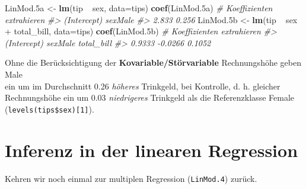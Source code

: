 \documentclass[12pt,ngerman,]{book}
\makeatletter
\newenvironment{Shaded}{\begin{snugshade}}{\end{snugshade}}
\newcommand{\KeywordTok}[1]{\textcolor[rgb]{0.13,0.29,0.53}{\textbf{{#1}}}}
\newcommand{\DataTypeTok}[1]{\textcolor[rgb]{0.13,0.29,0.53}{{#1}}}
\newcommand{\StringTok}[1]{\textcolor[rgb]{0.31,0.60,0.02}{{#1}}}
\newcommand{\CommentTok}[1]{\textcolor[rgb]{0.56,0.35,0.01}{\textit{{#1}}}}
\newcommand{\NormalTok}[1]{{#1}}
\newenvironment{kframe}{%
\medskip{}
\setlength{\fboxsep}{.8em}
 \def\at@end@of@kframe{}%
 \ifinner\ifhmode%
  \def\at@end@of@kframe{\end{minipage}}%
  \begin{minipage}{\columnwidth}%
 \fi\fi%
 \def\FrameCommand##1{\hskip\@totalleftmargin \hskip-\fboxsep
 \colorbox{shadecolor}{##1}\hskip-\fboxsep
     \hskip-\linewidth \hskip-\@totalleftmargin \hskip\columnwidth}%
 \MakeFramed {\advance\hsize-\width
   \@totalleftmargin\z@ \linewidth\hsize
   \@setminipage}}%
 {\par\unskip\endMakeFramed%
 \at@end@of@kframe}
\renewenvironment{Shaded}{\begin{kframe}}{\end{kframe}}
\makeatother
\begin{document}
\begin{Shaded}
\begin{Highlighting}[]
\NormalTok{LinMod.5a <-}\StringTok{ }\KeywordTok{lm}\NormalTok{(tip ~}\StringTok{  }\NormalTok{sex, }\DataTypeTok{data=}\NormalTok{tips)}
\KeywordTok{coef}\NormalTok{(LinMod.5a) }\CommentTok{# Koeffizienten extrahieren}
\CommentTok{#> (Intercept)     sexMale }
\CommentTok{#>       2.833       0.256}
\NormalTok{LinMod.5b <-}\StringTok{ }\KeywordTok{lm}\NormalTok{(tip ~}\StringTok{  }\NormalTok{sex +}\StringTok{ }\NormalTok{total_bill, }\DataTypeTok{data=}\NormalTok{tips)}
\KeywordTok{coef}\NormalTok{(LinMod.5b) }\CommentTok{# Koeffizienten extrahieren}
\CommentTok{#> (Intercept)     sexMale  total_bill }
\CommentTok{#>      0.9333     -0.0266      0.1052}
\end{Highlighting}
\end{Shaded}

Ohne die Berücksichtigung der \textbf{Kovariable/Störvariable}
Rechnungshöhe geben Male\\
ein um im Durchschnitt 0.26 \emph{höheres} Trinkgeld, bei Kontrolle, d.
h. gleicher Rechnungshöhe ein um 0.03 \emph{niedrigeres} Trinkgeld als
die Referenzklasse Female (\texttt{levels(tips\$sex){[}1{]}}).

\section{Inferenz in der linearen
Regression}\label{inferenz-in-der-linearen-regression}

Kehren wir noch einmal zur multiplen Regression (\texttt{LinMod.4})
zurück.
\end{document}

